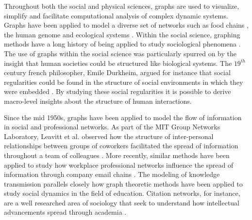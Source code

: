 \documentclass{sigchi}
\begin{document}
Throughout both the social and physical sciences, graphs are used to visualize, simplify and facilitate computational analysis of complex dynamic systems. Graphs have been applied to model a diverse set of networks such as food chains \cite{Hall1993}, the human genome\cite{Pevzner1989} and ecological systems \cite{Fortin2012}. Within the social science, graphing methods have a long history of being applied to study sociological phenomena \cite{Borgatti2009}. The use of graphs within the social science was particularly spurred on by the insight that human societies could be structured like biological systems. The $19^{th}$ century french philosopher, Emile Durkheim, argued for instance that social regularities could be found in the structure of social environments in which they were embedded \cite{Durkheim1951}. By studying these social regularities it is possible to derive macro-level insights about the structure of human interactions. 

Since the mid 1950s, graphs have been applied to model the flow of information in social and professional networks. As part of the MIT Group Networks Laboratory, Leavitt et al. observed how the structure of inter-personal relationships between groups of coworkers facilitated the spread of information throughout a team of colleagues \cite{Leavitt1951}. More recently, similar methods have been applied to study how workplace professional networks influence the spread of information through company email chains \cite{Fisher2004}. The modeling of knowledge transmission parallels closely how graph theoretic methods have been applied to study social dynamics in the field of education. Citation networks, for instance, are a well researched area of sociology that seek to understand how intellectual advancements spread through academia \cite{Batagelj2003}\cite{Garfield1964}. 


\end{document}
